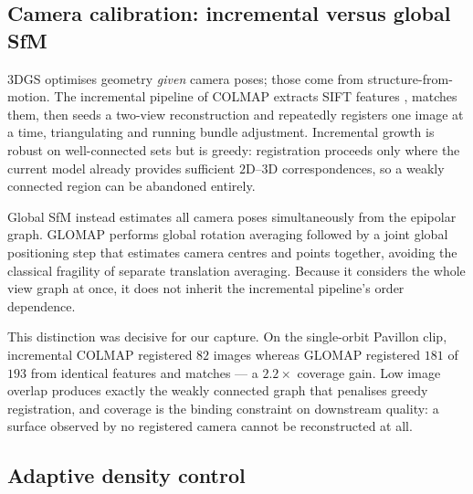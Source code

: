 \subsection{Camera calibration: incremental versus global SfM}
\label{sec:sfm}

3DGS optimises geometry \emph{given} camera poses; those come from
structure-from-motion. The incremental pipeline of COLMAP
\cite{schoenberger2016sfm} extracts SIFT features \cite{lowe2004sift}, matches
them, then seeds a two-view reconstruction and repeatedly registers one image at a
time, triangulating and running bundle adjustment. Incremental growth is robust on
well-connected sets but is greedy: registration proceeds only where the current
model already provides sufficient $2$D--$3$D correspondences, so a weakly
connected region can be abandoned entirely.

Global SfM instead estimates all camera poses simultaneously from the epipolar
graph. GLOMAP \cite{pan2024glomap} performs global rotation averaging followed by
a joint global positioning step that estimates camera centres and points together,
avoiding the classical fragility of separate translation averaging. Because it
considers the whole view graph at once, it does not inherit the incremental
pipeline's order dependence.

This distinction was decisive for our capture. On the single-orbit Pavillon clip,
incremental COLMAP registered $82$ images whereas GLOMAP registered $181$ of
$193$ from identical features and matches --- a $2.2\times$ coverage gain. Low
image overlap produces exactly the weakly connected graph that penalises greedy
registration, and coverage is the binding constraint on downstream quality: a
surface observed by no registered camera cannot be reconstructed at all.

\subsection{Adaptive density control}
\label{sec:densification}

